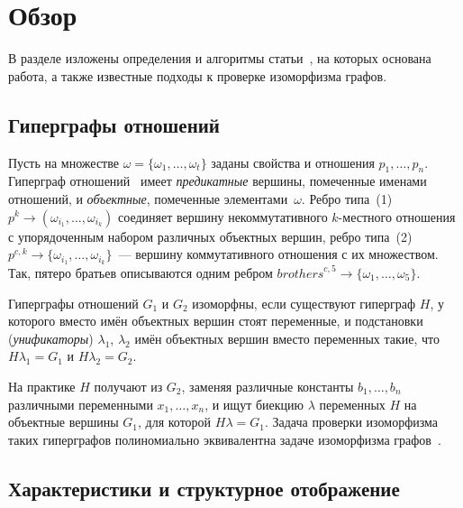 
\section{Обзор}
\label{sec:review}

В разделе изложены определения и алгоритмы статьи~\cite{KosovskayaIsom}, на которых основана работа, а также известные подходы к проверке изоморфизма графов.

\subsection{Гиперграфы отношений}

Пусть на множестве $\omega = \{\omega_1, \dots, \omega_t\}$ заданы свойства и отношения $p_1, \dots, p_n$.
Гиперграф отношений~\cite{KosovskayaHypergraphs2025} имеет \emph{предикатные} вершины, помеченные именами отношений, и \emph{объектные}, помеченные элементами~$\omega$.
Ребро типа~(1) $p^k \to (\omega_{i_1}, \dots, \omega_{i_k})$ соединяет вершину некоммутативного $k$-местного отношения с упорядоченным набором различных объектных вершин, ребро типа~(2) $p^{c,k} \to \{\omega_{i_1}, \dots, \omega_{i_k}\}$~--- вершину коммутативного отношения с их множеством.
Так, пятеро братьев описываются одним ребром $\mathit{brothers}^{c,5} \to \{\omega_1, \dots, \omega_5\}$.

\begin{definition}
    Гиперграфы отношений $G_1$ и $G_2$ изоморфны, если существуют гиперграф $H$, у которого вместо имён объектных вершин стоят переменные, и подстановки (\emph{унификаторы}) $\lambda_1$, $\lambda_2$ имён объектных вершин вместо переменных такие, что $H\lambda_1 = G_1$ и $H\lambda_2 = G_2$.
\end{definition}

На практике $H$ получают из $G_2$, заменяя различные константы $b_1, \dots, b_n$ различными переменными $x_1, \dots, x_n$, и ищут биекцию $\lambda$ переменных $H$ на объектные вершины $G_1$, для которой $H\lambda = G_1$.
Задача проверки изоморфизма таких гиперграфов полиномиально эквивалентна задаче изоморфизма графов~\cite{KosovskayaIsom, KosovskayaKosovskii2019}.

\subsection{Характеристики и структурное отображение}


